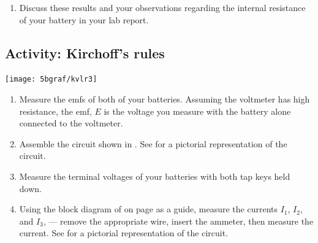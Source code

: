\begin{multicols}{2}
\begin{enumerate}
	\item Discuss these results and your observations regarding the internal resistance of your battery in your lab report.
\end{enumerate}



\subsection{Activity: Kirchoff's rules}

\begin{center}
	\texttt{[image: 5bgraf/kvlr3]}	 %
	\label{f:kvlr3}
\end{center}

\begin{enumerate}
	 \item Measure the emfs of both of your batteries.  Assuming the voltmeter has high resistance, the emf, $E$ is the voltage you measure with the battery alone connected to the voltmeter.
	\item Assemble the circuit shown in .
	See  for a pictorial representation of the circuit.
	\item Measure the terminal voltages of your batteries with both tap keys held down.
	\item Using the block diagram of  on page \pageref{f:circboard} as a guide, measure the currents $I_1$, $I_2$, and $I_3$, --- remove the appropriate wire, insert the ammeter, then measure the current.
	See  for a pictorial representation of the circuit.


\end{enumerate}
\end{multicols}
